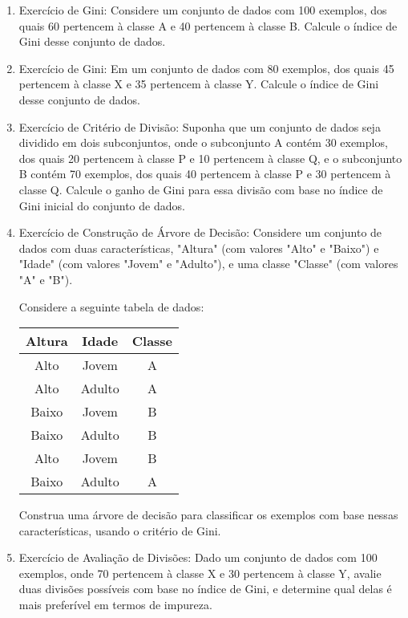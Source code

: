 \documentclass[12pt,a4paper, brazil]{article}
\begin{document}
\begin{enumerate}

\item Exercício de Gini:
   Considere um conjunto de dados com 100 exemplos, dos quais 60 pertencem à classe A e 40 pertencem à classe B. Calcule o índice de Gini desse conjunto de dados.

   \item Exercício de Gini:
   Em um conjunto de dados com 80 exemplos, dos quais 45 pertencem à classe X e 35 pertencem à classe Y. Calcule o índice de Gini desse conjunto de dados.

   \item Exercício de Critério de Divisão:
   Suponha que um conjunto de dados seja dividido em dois subconjuntos, onde o subconjunto A contém 30 exemplos, dos quais 20 pertencem à classe P e 10 pertencem à classe Q, e o subconjunto B contém 70 exemplos, dos quais 40 pertencem à classe P e 30 pertencem à classe Q. Calcule o ganho de Gini para essa divisão com base no índice de Gini inicial do conjunto de dados.

   \item Exercício de Construção de Árvore de Decisão:
   Considere um conjunto de dados com duas características, "Altura" (com valores "Alto" e "Baixo") e "Idade" (com valores "Jovem" e "Adulto"), e uma classe "Classe" (com valores "A" e "B"). 
   
   Considere a seguinte tabela de dados:

    \begin{center}
    \begin{tabular}{ |c|c|c| }
    \hline
    Altura & Idade & Classe \\
    \hline
    Alto & Jovem & A \\
    Alto & Adulto & A \\
    Baixo & Jovem & B \\
    Baixo & Adulto & B \\
    Alto & Jovem & B \\
    Baixo & Adulto & A \\
    \hline
    \end{tabular}
    \end{center}
   
   Construa uma árvore de decisão para classificar os exemplos com base nessas características, usando o critério de Gini.

   \item Exercício de Avaliação de Divisões:
   Dado um conjunto de dados com 100 exemplos, onde 70 pertencem à classe X e 30 pertencem à classe Y, avalie duas divisões possíveis com base no índice de Gini, e determine qual delas é mais preferível em termos de impureza.

\end{enumerate}
\end{document}
